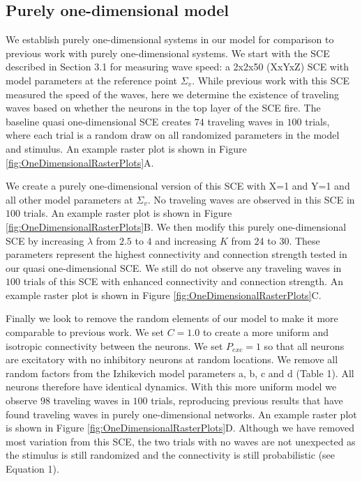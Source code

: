 \documentclass[12pt]{article}
\begin{document}
\clearpage
\color{red}
\subsection*{Purely one-dimensional model}
We establish purely one-dimensional systems in our model for comparison to previous work with purely one-dimensional systems.
We start with the SCE described in Section 3.1 for measuring wave speed: a 2x2x50 (XxYxZ) SCE with model parameters at the reference point $\Sigma_v$. 
While previous work with this SCE measured the speed of the waves, here we determine the existence of traveling waves based on whether the neurons in the top layer of the SCE fire.
The baseline quasi one-dimensional SCE creates $74$ traveling waves in $100$ trials, where each trial is a random draw on all randomized parameters in the model and stimulus.
An example raster plot is shown in Figure \ref{fig:OneDimensionalRasterPlots}A.

We create a purely one-dimensional version of this SCE with X=1 and Y=1 and all other model parameters at $\Sigma_v$.
No traveling waves are observed in this SCE in $100$ trials. 
An example raster plot is shown in Figure \ref{fig:OneDimensionalRasterPlots}B.
We then modify this purely one-dimensional SCE by increasing $\lambda$ from $2.5$ to $4$ and increasing $K$ from $2$4 to $30$.
These parameters represent the highest connectivity and connection strength tested in our quasi one-dimensional SCE.
We still do not observe any traveling waves in $100$ trials of this SCE with enhanced connectivity and connection strength.
An example raster plot is shown in Figure \ref{fig:OneDimensionalRasterPlots}C.

Finally we look to remove the random elements of our model to make it more comparable to previous work.
We set $C=1.0$ to create a more uniform and isotropic connectivity between the neurons.
We set $P_{exc}=1$ so that all neurons are excitatory with no inhibitory neurons at random locations.
We remove all random factors from the Izhikevich model parameters a, b, c and d (Table 1).
All neurons therefore have identical dynamics.
With this more uniform model we observe $98$ traveling waves in $100$ trials, reproducing previous results that have found traveling waves in purely one-dimensional networks.
An example raster plot is shown in Figure \ref{fig:OneDimensionalRasterPlots}D.
Although we have removed most variation from this SCE, the two trials with no waves are not unexpected as the stimulus is still randomized and the connectivity is still probabilistic (see Equation 1).
\end{document}
